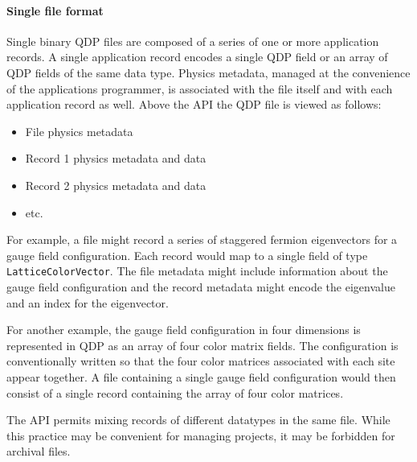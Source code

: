 \documentclass[12pt,letterpaper]{article}
\begin{document}
\paragraph{Single file format}

Single binary QDP files are composed of a series of one or more
application records.  A single application record encodes a single QDP
field or an array of QDP fields of the same data type.  Physics
metadata, managed at the convenience of the applications programmer,
is associated with the file itself and with each application record as
well. Above the API the QDP file is viewed as follows:
%
\begin{itemize}
  \item File physics metadata
  \item Record 1 physics metadata and data
  \item Record 2 physics metadata and data
  \item etc.
\end{itemize}
%
For example, a file might record a series of staggered fermion
eigenvectors for a gauge field configuration.  Each record would map
to a single field of type \verb|LatticeColorVector|.  The file metadata
might include information about the gauge field configuration and the
record metadata might encode the eigenvalue and an index for the
eigenvector.

For another example, the gauge field configuration in four dimensions
is represented in QDP as an array of four color matrix fields.  The
configuration is conventionally written so that the four color matrices
associated with each site appear together.  A file containing a single
gauge field configuration would then consist of a single record
containing the array of four color matrices.

The API permits mixing records of different datatypes in the same
file.  While this practice may be convenient for managing projects, it
may be forbidden for archival files.
\end{document}

